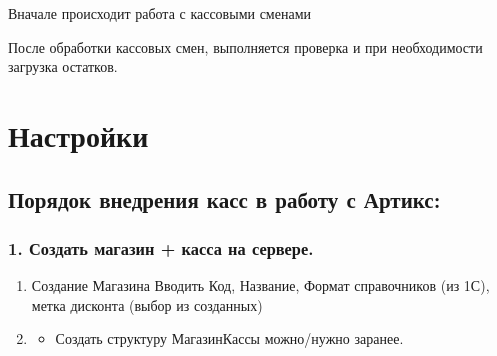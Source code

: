 \documentclass[letterpaper,10pt,russian]{sphinxmanual}
\begin{document}
\sphinxAtStartPar
Вначале происходит работа с кассовыми сменами

\sphinxAtStartPar
{}

\sphinxAtStartPar
После обработки кассовых смен, выполняется проверка и при необходимости загрузка остатков.

\sphinxAtStartPar
{}

\sphinxstepscope


\chapter{Настройки}
\label{\detokenize{setting:id1}}\label{\detokenize{setting::doc}}
\sphinxstepscope


\section{Порядок внедрения касс в работу с Артикс:}
\label{\detokenize{kass:id1}}\label{\detokenize{kass::doc}}

\subsection{1. Создать магазин + касса на сервере.}
\label{\detokenize{kass:id2}}\begin{enumerate}
%
\item {} 
\sphinxAtStartPar
Создание Магазина \sphinxhyphen{} Вводить Код, Название, Формат справочников (из 1С), метка дисконта (выбор из созданных)

\item {} \begin{description}
\begin{itemize}
\item {} 
\sphinxAtStartPar
Создать структуру Магазин\sphinxhyphen{}Кассы можно/нужно заранее.

\end{itemize}

\end{description}

\end{enumerate}
\end{document}
